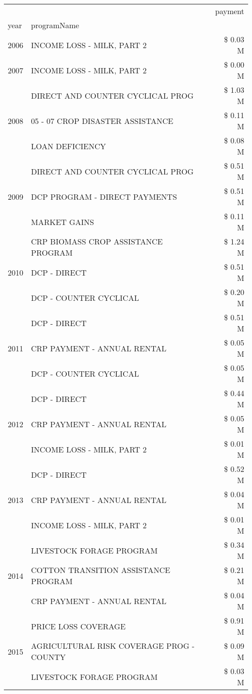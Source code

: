 \begin{tabular}{llr}
\toprule
 &  & payment \\
year & programName &  \\
\midrule
2006 & INCOME LOSS - MILK, PART 2 & \$ 0.03 M \\
\cline{1-3}
2007 & INCOME LOSS - MILK, PART 2 & \$ 0.00 M \\
\cline{1-3}
\multirow[t]{3}{*}{2008} & DIRECT AND COUNTER CYCLICAL PROG & \$ 1.03 M \\
 & 05 - 07 CROP DISASTER ASSISTANCE & \$ 0.11 M \\
 & LOAN DEFICIENCY & \$ 0.08 M \\
\cline{1-3}
\multirow[t]{3}{*}{2009} & DIRECT AND COUNTER CYCLICAL PROG & \$ 0.51 M \\
 & DCP PROGRAM - DIRECT PAYMENTS & \$ 0.51 M \\
 & MARKET GAINS & \$ 0.11 M \\
\cline{1-3}
\multirow[t]{3}{*}{2010} & CRP BIOMASS CROP ASSISTANCE PROGRAM & \$ 1.24 M \\
 & DCP - DIRECT & \$ 0.51 M \\
 & DCP - COUNTER CYCLICAL & \$ 0.20 M \\
\cline{1-3}
\multirow[t]{3}{*}{2011} & DCP - DIRECT & \$ 0.51 M \\
 & CRP PAYMENT - ANNUAL RENTAL & \$ 0.05 M \\
 & DCP - COUNTER CYCLICAL & \$ 0.05 M \\
\cline{1-3}
\multirow[t]{3}{*}{2012} & DCP - DIRECT & \$ 0.44 M \\
 & CRP PAYMENT - ANNUAL RENTAL & \$ 0.05 M \\
 & INCOME LOSS - MILK, PART 2 & \$ 0.01 M \\
\cline{1-3}
\multirow[t]{3}{*}{2013} & DCP - DIRECT & \$ 0.52 M \\
 & CRP PAYMENT - ANNUAL RENTAL & \$ 0.04 M \\
 & INCOME LOSS - MILK, PART 2 & \$ 0.01 M \\
\cline{1-3}
\multirow[t]{3}{*}{2014} & LIVESTOCK FORAGE PROGRAM & \$ 0.34 M \\
 & COTTON TRANSITION ASSISTANCE PROGRAM & \$ 0.21 M \\
 & CRP PAYMENT - ANNUAL RENTAL & \$ 0.04 M \\
\cline{1-3}
\multirow[t]{3}{*}{2015} & PRICE LOSS COVERAGE & \$ 0.91 M \\
 & AGRICULTURAL RISK COVERAGE PROG - COUNTY & \$ 0.09 M \\
 & LIVESTOCK FORAGE PROGRAM & \$ 0.03 M \\

\end{tabular}
